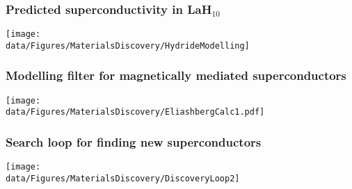 \begin{emptyframe}
    \frametitle{Predicted superconductivity in LaH$_{10}$}
    \centerline{\texttt{[image: \\data/Figures/MaterialsDiscovery/HydrideModelling]}}
\end{emptyframe}

\begin{emptyframe}
  \frametitle{Modelling filter for magnetically mediated superconductors}
  \centerline{\texttt{[image: \\data/Figures/MaterialsDiscovery/EliashbergCalc1.pdf]}}  
\end{emptyframe}
{}
\begin{emptyframe}
    \frametitle{Search loop for finding new superconductors}
    \centerline{\texttt{[image: \\data/Figures/MaterialsDiscovery/DiscoveryLoop2]}}
\end{emptyframe}



